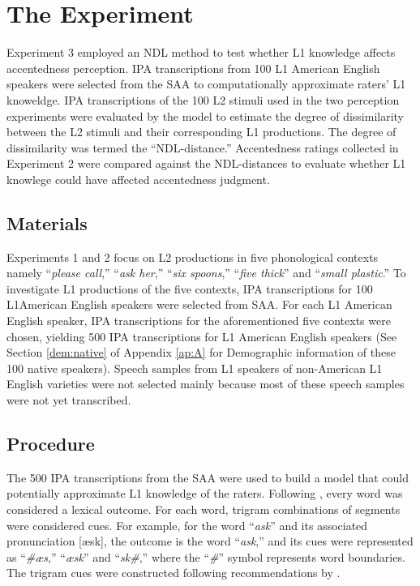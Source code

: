 \section{The Experiment}

Experiment 3 employed an NDL method to test whether L1 knowledge affects accentedness perception. IPA transcriptions from 100 L1 American English speakers were selected from the SAA to computationally approximate raters' L1 knoweldge. IPA transcriptions of the 100 L2 stimuli used in the two perception experiments were evaluated by the model to estimate the degree of dissimilarity between the L2 stimuli and their corresponding L1 productions. The degree of dissimilarity was termed the “NDL-distance.” Accentedness ratings collected in Experiment 2 were compared against the NDL-distances to evaluate whether L1 knowlege could have affected accentedness judgment. 

\subsection{Materials}

Experiments 1 and 2 focus on L2 productions in five phonological contexts namely “\textit{please call},” “\textit{ask her},” “\textit{six spoons},” “\textit{five thick}” and “\textit{small plastic}.” To investigate L1 productions of the five contexts, IPA transcriptions for 100 L1American English speakers were selected from SAA. For each L1 American English speaker, IPA transcriptions for the aforementioned five contexts were chosen, yielding 500 IPA transcriptions for L1 American English speakers (See Section \ref{dem:native} of Appendix \ref{ap:A} for Demographic information of these 100 native speakers). Speech samples from L1 speakers of non-American L1 English varieties were not selected mainly because most of these speech samples were not yet transcribed.

\subsection{Procedure}

The 500 IPA transcriptions from the SAA were used to build a model that could potentially approximate L1 knowledge of the raters. Following \citet{Wieling_2014}, every word was considered a lexical outcome. For each word, trigram combinations of segments were considered cues. For example, for the word “\textit{ask}” and its associated pronunciation [æsk], the outcome is the word “\textit{ask},” and its cues were represented as “\textit{\#æs},” “\textit{æsk}” and “\textit{sk\#},” where the “\textit{\#}” symbol represents word boundaries. The trigram cues were constructed following recommendations by \citet{Baayen_2016}. 


